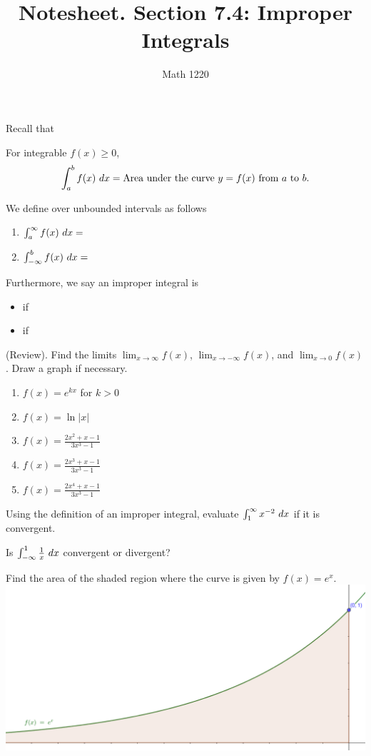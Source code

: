 \documentclass[12pt, a4paper]{article}
\author{Math 1220}
\title{Notesheet. Section 7.4: Improper Integrals}
\date{}
\begin{document}
\maketitle
\nameline
Recall that
\begin{thrm}
  For integrable \(f(x) \geq 0\), \[
    \int_a^b f(x) \ d x = \text{Area under the curve }y=f(x)\text{ from
    }a \text{ to }b.
  \]
\end{thrm}
\vspace{-1in}
\begin{defi}
  We define  over unbounded intervals as
  follows
  \begin{enumerate}
  \item \(\int_a^\infty f(x) \ d x = \)
  \item \(\int_{-\infty}^b f(x) \ d x =\)
  \end{enumerate}
  Furthermore, we say an improper integral is
  \begin{itemize}
  \item {} if
  \item {} if
  \end{itemize}
\end{defi}
\vspace{-1in}
\begin{ex}
  (Review). Find the limits
  \(\lim_{x \to \infty} f(x)\), \(\lim_{x \to -\infty} f(x)\), and
  \(\lim_{x \to 0} f(x)\). Draw
  a graph if necessary.
  \begin{enumerate}
  \item \(f(x) = e^{kx}\) for \(k > 0\)
  \item \(f(x) = \ln|x|\)
  \item \(f(x) = \frac{2x^2+x-1}{3x^3-1}\)
  \item \(f(x) = \frac{2x^3+x-1}{3x^3-1}\)
  \item \(f(x) = \frac{2x^4+x-1}{3x^3-1}\)
  \end{enumerate}
\end{ex}
\begin{ex}
  Using the definition of an improper integral, evaluate
  \(\int_1^\infty x^{-2} \ d x\) if it is convergent. 
\end{ex}
\begin{ex}
  Is \(\int_{-\infty}^1 \frac{1}{x} \ d x\) convergent or divergent?
\end{ex}
\begin{ex}
  Find the area of the shaded region where the curve is given by
  \(f(x)=e^x\).\\
  \includegraphics[scale=0.25]{images/e-improper-integral}
\end{ex}
\end{document}
